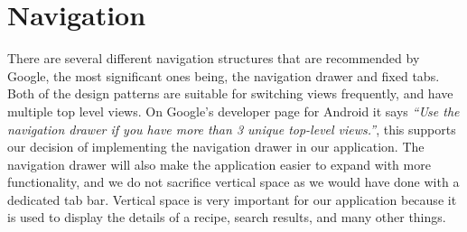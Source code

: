 \section{Navigation}\label{sec:navigation}
There are several different navigation structures that are recommended by Google, the most significant ones being, the navigation drawer and fixed tabs. Both of the design patterns are suitable for switching views frequently, and have multiple top level views. 
On Google's developer page for Android it says \textit{``Use the navigation drawer if you have more than 3 unique top-level views.''}\cite{guidelines-navigationdrawer}, this supports our decision of implementing the navigation drawer in our application. The navigation drawer will also make the application easier to expand with more functionality, and we do not sacrifice vertical space as we would have done with a dedicated tab bar. Vertical space is very important for our application because it is used to display the details of a recipe, search results, and many other things.

